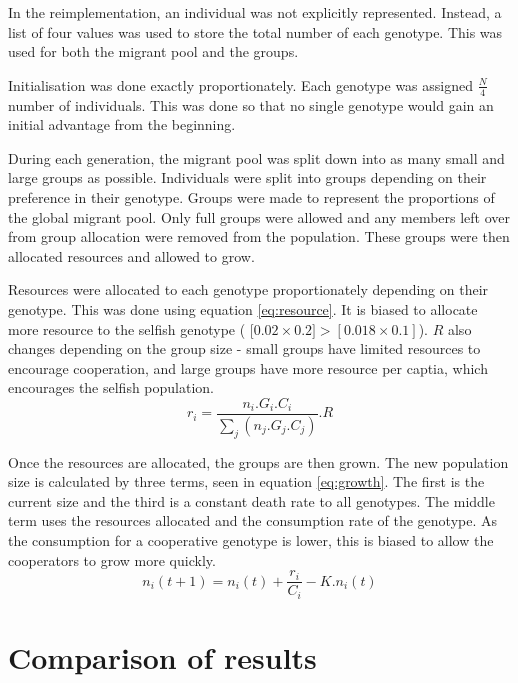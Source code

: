 \documentclass[11pt]{ecsarticle}
\begin{document}
In the reimplementation, an individual was not explicitly represented. 
Instead, a list of four values was used to store the total number of each genotype. 
This was used for both the migrant pool and the groups. 

Initialisation was done exactly proportionately. 
Each genotype was assigned $\tfrac{N}{4}$ number of individuals.
This was done so that no single genotype would gain an initial advantage from the beginning.

During each generation, the migrant pool was split down into as many small and large groups as possible.
Individuals were split into groups depending on their preference in their genotype.
Groups were made to represent the proportions of the global migrant pool. 
Only full groups were allowed and any members left over from group allocation were removed from the population. 
These groups were then allocated resources and allowed to grow. 

Resources were allocated to each genotype proportionately depending on their genotype.
This was done using equation \eqref{eq:resource}. 
It is biased to allocate more resource to the selfish genotype ( [$0.02 \times 0.2] > [0.018 \times 0.1]$). 
$R$ also changes depending on the group size - small groups have limited resources to encourage cooperation, and large groups have more resource per captia, which encourages the selfish population.
\begin{equation}
 r_i = \frac{ n_i . G_i . C_i }{\sum\limits_j (n_j . G_j . C_j )} . R 
 \label{eq:resource}
\end{equation}

Once the resources are allocated, the groups are then grown. 
The new population size is calculated by three terms, seen in equation \eqref{eq:growth}. 
The first is the current size and the third is a constant death rate to all genotypes.
The middle term uses the resources allocated and the consumption rate of the genotype.
As the consumption for a cooperative genotype is lower, this is biased to allow the cooperators to grow more quickly.
\begin{equation}
 n_i (t + 1) = n_i (t) + \frac{r_i}{C_i} - K.n_i (t)
 \label{eq:growth}
\end{equation}



\section{Comparison of results}\label{sc:reimp:results}
\end{document}
